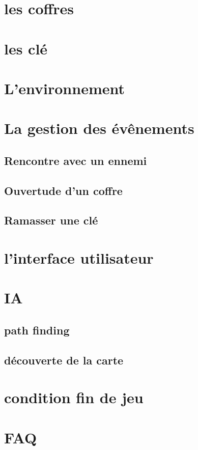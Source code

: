 \documentclass[a4paper 12pts]{article}
\begin{document}
\section{les coffres}

\section{les clé}


\section{L'environnement}


\section{La gestion des évênements}


\subsection {Rencontre avec un ennemi} 
\subsection {Ouvertude d'un coffre}
\subsection {Ramasser une clé}


\section{l'interface utilisateur}

\section{IA}

\subsection{path finding}

\subsection{découverte de la carte}

\section{condition fin de jeu}

\section {FAQ}
\end{document}
